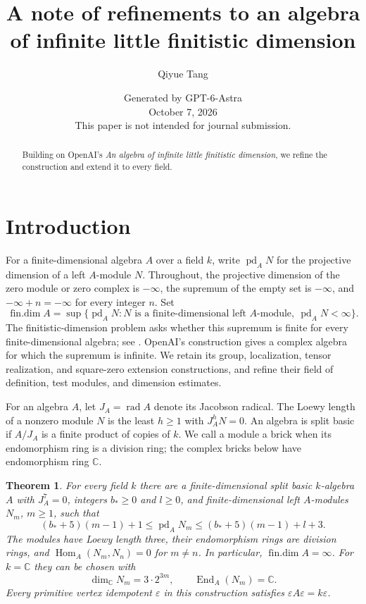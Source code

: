 \documentclass[11pt]{article}
\title{A note of refinements to an algebra of infinite little finitistic dimension}
\author{Qiyue Tang}
\date{\small Generated by GPT-6-Astra\\[6pt]
October 7, 2026\\[3pt]\small This paper is not intended for journal submission.}
\newtheorem{theorem}{Theorem}[section]
\numberwithin{equation}{section}
\theoremstyle{definition}
\theoremstyle{remark}
\newcommand{\C}{\mathbb C}
\DeclareMathOperator{\Hom}{Hom}
\DeclareMathOperator{\End}{End}
\DeclareMathOperator{\pd}{pd}
\DeclareMathOperator{\findim}{fin.dim}
\DeclareMathOperator{\rad}{rad}
\begin{document}
\maketitle
\begingroup\renewcommand{\thefootnote}{}\endgroup
\begin{abstract}
Building on OpenAI's \emph{An algebra of infinite little finitistic dimension},
we refine the construction and extend it to every field.
\end{abstract}
\section{Introduction}\label{sec:introduction}
For a finite-dimensional algebra $A$ over a field $k$, write $\pd_A N$
for the projective dimension of a left $A$-module $N$.
Throughout, the projective dimension of the zero module or zero complex
is $-\infty$, the supremum of the empty set is $-\infty$, and
$-\infty+n=-\infty$ for every integer $n$. Set
\[
\findim A=\sup\{\pd_A N:N\text{ is a finite-dimensional left }A\text{-module},\ \pd_A N<\infty\}.
\]
The finitistic-dimension problem asks whether this supremum is finite
for every finite-dimensional algebra; see \cite{Bass1960,HuisgenZimmermann1995}.
OpenAI's construction \cite{OpenAI198} gives a complex algebra for which
the supremum is infinite. We retain its group, localization, tensor
realization, and square-zero extension constructions, and refine their
field of definition, test modules, and dimension estimates.

For an algebra $A$, let $J_A=\rad A$ denote its Jacobson radical.
The Loewy length of a nonzero module $N$ is the least $h\ge1$ with
$J_A^hN=0$. An algebra is split basic if $A/J_A$ is a finite product
of copies of $k$. We call a module a brick when its endomorphism ring
is a division ring; the complex bricks below have endomorphism ring $\C$.

\begin{theorem}\label{thm:main}
For every field $k$ there are a finite-dimensional split basic
$k$-algebra $A$ with $J_A^7=0$, integers $b_*\ge0$ and $l\ge0$,
and finite-dimensional left $A$-modules $N_m$, $m\ge1$, such that
\[
(b_*+5)(m-1)+1\le\pd_A N_m\le(b_*+5)(m-1)+l+3.
\]
The modules have Loewy length three, their endomorphism rings are
division rings, and $\Hom_A(N_m,N_n)=0$ for $m\ne n$.
In particular, $\findim A=\infty$.
For $k=\C$ they can be chosen with
\[
\dim_{\C}N_m=3\cdot2^{3m},\qquad \End_A(N_m)=\C.
\]
Every primitive vertex idempotent $\varepsilon$ in this construction
satisfies $\varepsilon A\varepsilon=k\varepsilon$.
\end{theorem}
\end{document}
